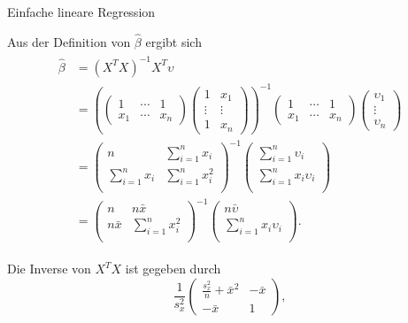 \documentclass[
  8pt,
  ignorenonframetext,
]{beamer}
\begin{document}
\begin{frame}{Einfache lineare Regression}
\protect\hypertarget{einfache-lineare-regression-4}{}
\footnotesize

Aus der Definition von \(\hat{\beta}\) ergibt sich \begin{align}
\begin{split}
\hat{\beta}
& = (X^T X)^{-1}X^T\upsilon \\
& =
\left(
\begin{pmatrix}
1   & \cdots & 1 \\
x_1 & \cdots & x_n
\end{pmatrix}
\begin{pmatrix}
1       & x_1       \\
\vdots  & \vdots    \\
1       & x_n
\end{pmatrix}
\right)^{-1}
\begin{pmatrix}
1   & \cdots & 1 \\
x_1 & \cdots & x_n
\end{pmatrix}
\begin{pmatrix}
\upsilon_1     \\
\vdots  \\
\upsilon_n
\end{pmatrix} \\
& =
\begin{pmatrix}
n                   & \sum_{i=1}^n x_i \\
\sum_{i=1}^n x_i    & \sum_{i=1}^n x_i^2\\
\end{pmatrix}^{-1}
\begin{pmatrix}
\sum_{i=1}^n \upsilon_i    \\
\sum_{i=1}^n x_i \upsilon_i    \\
\end{pmatrix}
\\
& =
\begin{pmatrix}
n           &  n\bar{x} \\
n\bar{x}    & \sum_{i=1}^n x_i^2\\
\end{pmatrix}^{-1}
\begin{pmatrix}
n\bar{\upsilon}    \\
\sum_{i=1}^n x_i \upsilon_i    \\
\end{pmatrix}.
\end{split}
\end{align}

Die Inverse von \(X^T X\) ist gegeben durch \begin{equation}
\frac{1}{s_x^2}
\begin{pmatrix}
  \frac{s_x^2}{n} + \bar{x}^2
& -\bar{x}
\\
  -\bar{x}
&  1
\end{pmatrix},
\end{equation}
\end{frame}
\end{document}
